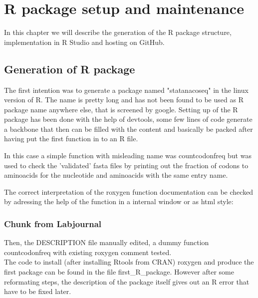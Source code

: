 \chapter{R package setup and maintenance}
In this chapter we will describe the generation of the R package structure, implementation in R Studio and hosting on GitHub.


\section{Generation of R package}
The first intention was to generate a package named "statanacoseq" in the linux version of R. The name is pretty long and has not been found to be used as R package name anywhere else, that is screened by google.
Setting up of the R package has been done with the help of devtools, some few lines of code generate a backbone that then can be filled with the content and basically be packed after having put the first function in to an R file. 

  

In this case a simple function with misleading name was countcodonfreq but was used to check the 'validated' fasta files by printing out the fraction of codons to aminoacids for the nucleotide and aminoacids with the same entry name. 
  
The correct interpretation of the roxygen function documentation can be checked by adressing the help of the function in a internal window or as html style:
  

\subsection{Chunk from Labjournal}
Then, the DESCRIPTION file manually edited, a dummy function countcodonfreq with existing roxygen comment tested. \\
The code to install (after installing Rtools from CRAN) roxygen and produce the first package can be found in the file first\_R\_package. However after some reformating steps, the description of the package itself gives out an R error that have to be fixed later. \\



